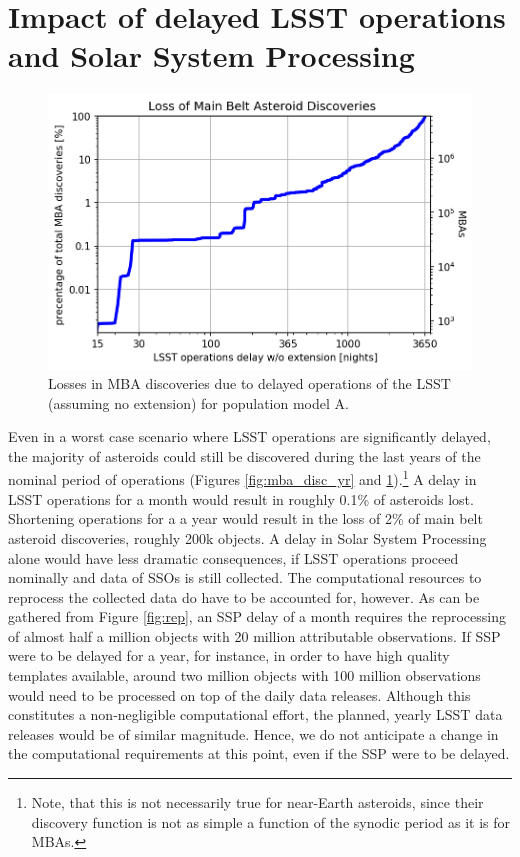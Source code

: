 \section{Impact of delayed \gls{LSST} operations and Solar System Processing} \label{sec:delay}
\begin{figure}[tb!]
\begin{center}
\includegraphics[width=0.70\linewidth]{figs/lost4.png}
\end{center}
\caption{Losses in \gls{MBA} discoveries due to delayed operations of the \gls{LSST} (assuming no extension) for population model A.}
\label{fig:lost}       %
\end{figure}
Even in a worst case scenario where \gls{LSST} operations are significantly delayed, the majority of asteroids could still be discovered during the last years of the nominal period of operations (Figures \ref{fig:mba_disc_yr} and \ref{fig:lost}).\footnote{Note, that this is not necessarily true for near-Earth asteroids, since their discovery function is not as simple a function of the synodic period as it is for MBAs.} 
A delay in \gls{LSST} operations for a month would result in roughly 0.1\% of asteroids lost. Shortening operations for a 
a year would result in the loss of 2\% of main belt asteroid discoveries, roughly 200k objects.
A delay in Solar System Processing alone would have less dramatic consequences, if \gls{LSST} operations proceed nominally and data of SSOs is still collected.
The computational resources to reprocess the collected data do have to be accounted for, however. As can be gathered from Figure \ref{fig:rep}, an \gls{SSP} delay of a month requires the reprocessing of almost half a million objects with 20 million attributable observations. If \gls{SSP} were to be delayed for a year, for instance, in order to have high quality templates available, around two million objects with 100 million observations would need to be processed on top of the daily data releases. Although this constitutes a non-negligible computational effort, the planned, yearly \gls{LSST} data releases would be of similar magnitude. Hence, we do not anticipate a change in the computational requirements at this point, even if the \gls{SSP} were to be delayed.
